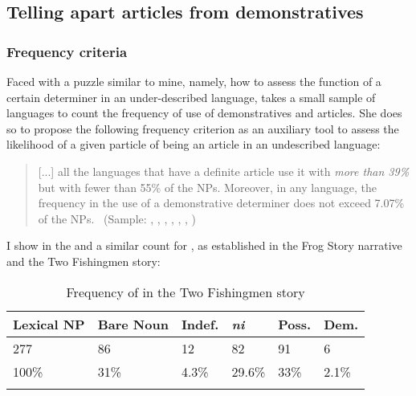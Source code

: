\documentclass[output=paper
,modfonts
,nonflat]{langsci/langscibook}
\begin{document}
\subsection{Telling apart articles from demonstratives}\label{sec:pico:4.1}

\subsubsection{Frequency criteria}\label{sec:pico:4.1.1}

Faced with a puzzle similar to mine, namely, how to assess the function of a certain determiner in an under-described language, \citet{Cyr1993} takes a small sample of languages to count the frequency of use of demonstratives and articles. She does so to propose the following frequency criterion as an auxiliary tool to assess the likelihood of a given particle of being an article in an undescribed language:


\begin{quotation}
	[...] all the languages that have a definite article use it with \textit{more than 39\%} but with fewer than 55\% of the NPs. Moreover, in any language, the frequency in the use of a demonstrative determiner does not exceed 7.07\% of the NPs.~\citep[222]{Cyr1993} (Sample: , , , , , , )
\end{quotation}


I show in the  and  a similar count for , as established in the Frog Story narrative and the Two Fishingmen story:

\begin{table}[h]
	\centering
	\caption{Frequency of  in the Two Fishingmen story}
	\label{tab:pico:3}
	\begin{tabularx}{.75\textwidth}{llXXXX}
		\lsptoprule
		Lexical NP & Bare Noun & Indef. & \cellcolor[HTML]{EFEFEF}\textit{ni} & Poss.  & Dem.  \\ \midrule
		277        & 86        & 12     & 82                                  & 91     & 6     \\ 
		100\%      & 31\%      & 4.3\%  & \cellcolor[HTML]{EFEFEF}29.6\%      & 33\% & 2.1\% \\ \lspbottomrule
	\end{tabularx}
\end{table}
\end{document}
